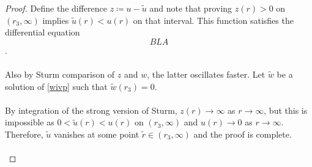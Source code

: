 \begin{lemma}
\begin{proof}
Define the difference $z\coloneqq u-\tilde u$ and note that proving $z(r)>0$ on $(r_3,\infty)$ implies $\tilde u(r)<u(r)$ on that interval. This function satisfies the differential equation $$\label{zivp} BLA $$.
\\
\\
Also by Sturm comparison of $z$ and $w$, the latter oscillates faster. Let $\tilde w$ be a solution of \eqref{wivp} such that $\tilde w(r_3)=0$. 
\\
\\
By integration of the strong version of Sturm, $z(r)\to\infty$ as $r\to\infty$, but this is impossible as $0<\tilde u(r)<u(r)$ on $(r_3,\infty)$ and $u(r)\to0$ as $r\to\infty$. Therefore, $\tilde u$ vanishes at some point $\tilde r\in(r_3,\infty)$ and the proof is complete.
\\
\\  \end{proof}
\end{lemma}

